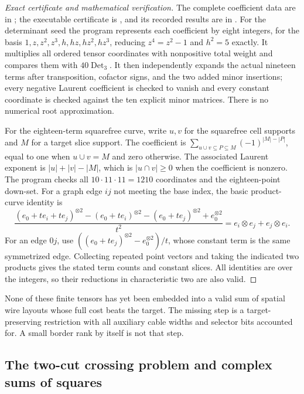 \begin{proof}[Exact certificate and mathematical verification]
The complete coefficient data are in
; the executable certificate is
, and its recorded results
are in .
For the determinant seed the program represents each coefficient by
eight integers, for the basis $1,z,z^2,z^3,h,hz,hz^2,hz^3$, reducing
$z^4=z^2-1$ and $h^2=5$ exactly. It multiplies all ordered tensor
coordinates with nonpositive total weight and compares them with
$40\operatorname{Det}_3$. It then independently expands the actual
nineteen terms after transposition, cofactor signs, and the two added
minor insertions; every negative Laurent coefficient is checked to
vanish and every constant coordinate is checked against the ten
explicit minor matrices. There is no numerical root approximation.

For the eighteen-term squarefree curve, write $u,v$ for the squarefree
cell supports and $M$ for a target slice support. The coefficient is
$\sum_{u\cup v\subseteq P\subseteq M}(-1)^{|M|-|P|}$, equal to one
when $u\cup v=M$ and zero otherwise. The associated Laurent exponent
is $|u|+|v|-|M|$, which is $|u\cap v|\geq0$ when the coefficient is
nonzero. The program checks all $10\cdot11\cdot11=1210$ coordinates
and the eighteen-point down-set. For a graph edge $ij$ not meeting the
base index, the basic product-curve identity is
\[
 \frac{(e_0+t e_i+t e_j)^{\otimes2}-(e_0+t e_i)^{\otimes2}
 -(e_0+t e_j)^{\otimes2}+e_0^{\otimes2}}{t^2}
 =e_i\otimes e_j+e_j\otimes e_i.
\]
For an edge $0j$, use
$((e_0+t e_j)^{\otimes2}-e_0^{\otimes2})/t$,
whose constant term is the same symmetrized edge. Collecting repeated
point vectors and taking the indicated two products gives the stated
term counts and constant slices. All identities are over the integers,
so their reductions in characteristic two are also valid.
\end{proof}

None of these finite tensors has yet been embedded into a valid sum of
spatial wire layouts whose full cost beats the target. The missing
step is a target-preserving restriction with all auxiliary cable
widths and selector bits accounted for. A small border rank by itself
is not that step.

\subsection{The two-cut crossing problem and complex sums of squares}
\label{sec:root-sos}

